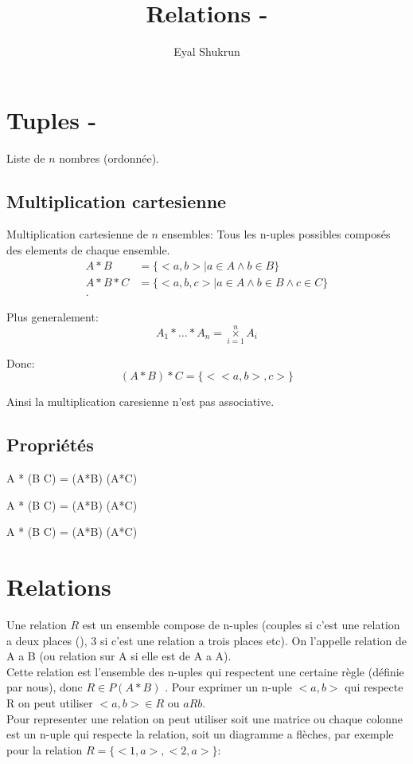\documentclass{article}
\title{Relations - \cjRL{y.hsym} }
\author{Eyal Shukrun}
\begin{document}
\maketitle

\section{Tuples - }
Liste de $n$ nombres (ordonnée).

\subsection{Multiplication cartesienne}
Multiplication cartesienne de $n$ ensembles: Tous les n-uples possibles composés des elements de chaque ensemble.
\begin{align*}
  A * B &= \{<a,b> | a \in A \land b \in B\}\\
  A * B * C &= \{<a,b,c> | a \in A \land b \in B \land c \in C\}\\
.\end{align*}

Plus generalement: 
\begin{equation}
  A_1 * \ldots * A_n = \underset{i=1}{\overset{n}{\times}} A_i 
\end{equation}

Donc:
\begin{equation}
  (A*B)*C = \{<<a,b>, c>\}
\end{equation}

Ainsi la multiplication caresienne n'est pas associative.  

\subsection{Propriétés}
  \item A * (B \cup C) = (A*B) \cup (A*C)
  \item A * (B \cap C) = (A*B) \cap (A*C)
  \item A * (B \setminus  C) = (A*B) \setminus (A*C)

\section{Relations}
 
Une relation $R$ est un ensemble compose de n-uples (couples si c'est une relation a deux places (), 3 si c'est une relation a trois places etc). On l'appelle relation de A a B (ou relation sur A si elle est de A a A).\\
Cette relation est l'ensemble des n-uples qui respectent une certaine règle (définie par nous), donc $R \in P(A*B)$
. Pour exprimer un n-uple $<a,b>$ qui respecte R on peut utiliser $<a,b> \in R$ ou $aRb$. \\
Pour representer une relation on peut utiliser soit une matrice ou chaque colonne est un n-uple qui respecte la relation, soit un diagramme a flèches, par exemple pour la relation $R = \{<1,a>, <2, a>\}$:


\end{document}

